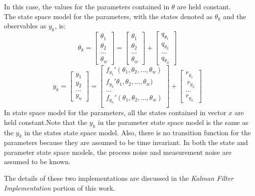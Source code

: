 In this case, the values for the parameters contained in $\theta$ are held constant.\\
The state space model for the parameters, with the states denoted as $\theta_k$ and the observables as $y_k$, is:
        \begin{equation}
    \theta_k = 
    \begin{bmatrix}
    \theta_1\\
    \theta_2\\
    ...\\
    \theta_w
    \end{bmatrix} = 
    \begin{bmatrix}
    \theta_1\\
    \theta_2\\
    ...\\
    \theta_w
    \end{bmatrix} +
    \begin{bmatrix}
    q_{\theta_1}\\
    q_{\theta_2}\\
    ...\\
    q_{\theta_w}
    \end{bmatrix}
    \end{equation}
    \begin{equation}
    y_k = 
    \begin{bmatrix}
    y_1\\
    y_2\\
    ...\\
    y_n
    \end{bmatrix} = 
    \begin{bmatrix}
    f_{y_1}'(\theta_1, \theta_2, ..., \theta_w)\\
    f_{y_2}'\theta_1, \theta_2, ..., \theta_w)\\
    ...\\
    f_{y_n}'(\theta_1, \theta_2, ..., \theta_w)\\
    \end{bmatrix} +
    \begin{bmatrix}
    r_{y_1}\\\
    r_{y_2}\\
    ...\\
    r_{y_n}
    \end{bmatrix}
    \end{equation}
In state space model for the parameters, all the states contained in vector $x$ are held constant.Note that the $y_k$ in the parameter state space model is the same as the $y_k$ in the states state space model. Also, there is no transition function for the parameters because they are assumed to be time invariant. In both the state and parameter state space models, the process noise and measurement noise are assumed to be known. 

The details of these two implementations are discussed in the \emph{Kalman Filter Implementation} portion of this work.
    
    
